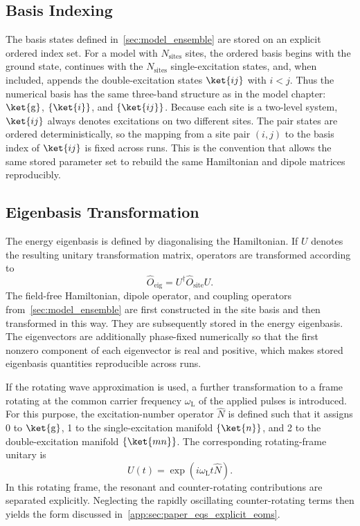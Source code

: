 \subsection{Basis Indexing}

The basis states defined in~\autoref{sec:model_ensemble} are stored on an
explicit ordered index set. For a model with \(N_{\mathrm{sites}}\) sites, the
ordered basis begins with the ground state, continues with the
\(N_{\mathrm{sites}}\) single-excitation states, and, when included, appends
the double-excitation states \(\ket{ij}\) with \(i<j\). Thus the numerical
basis has the same three-band structure as in the model chapter:
\(\ket{\mathrm{g}}\), \(\{\ket{i}\}\), and \(\{\ket{ij}\}\). Because each site is a
two-level system, \(\ket{ij}\) always denotes excitations on two different
sites. The pair states are ordered deterministically, so the mapping from a
site pair \((i,j)\) to the basis index of \(\ket{ij}\) is fixed across runs.
This is the convention that allows the same stored parameter set to rebuild the
same Hamiltonian and dipole matrices reproducibly.

\subsection{Eigenbasis Transformation}

The energy eigenbasis is defined by diagonalising the Hamiltonian. If \(U\)
denotes the resulting unitary transformation matrix, operators are transformed
according to
\begin{equation*}
\hat{O}_{\mathrm{eig}} = U^{\dagger}\hat{O}_{\mathrm{site}}U.
\end{equation*}
The field-free Hamiltonian, dipole operator, and coupling operators
from~\autoref{sec:model_ensemble} are first constructed in the site basis and
then transformed in this way. They are subsequently stored in the energy
eigenbasis. The eigenvectors are additionally phase-fixed numerically so that
the first nonzero component of each eigenvector is real and positive, which
makes stored eigenbasis quantities reproducible across runs.

If the rotating wave approximation is used, a further transformation to a frame rotating at the
common carrier frequency \(\omega_{\mathrm{L}}\) of the applied pulses is introduced. For
this purpose, the excitation-number operator \(\hat{N}\) is defined such that
it assigns 0 to \(\ket{\mathrm{g}}\), 1 to the single-excitation manifold
\(\{\ket{n}\}\), and 2 to the double-excitation manifold \(\{\ket{mn}\}\). The
corresponding rotating-frame unitary is
\begin{equation*}
    U(t)=\exp\!\left(i\omega_{\mathrm{L}} t \hat{N}\right).
\end{equation*}
In this rotating frame, the resonant and counter-rotating contributions are
separated explicitly. Neglecting the rapidly oscillating counter-rotating terms
then yields the form discussed
in~\autoref{app:sec:paper_eqs_explicit_eoms}.

